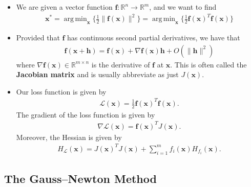\documentclass[10pt]{article}
\newcommand{\ve}[1]{\mathbf{#1}}
\newcommand{\ra}{\rightarrow}
\newcommand{\mcal}[1]{\mathcal{#1}}
\newcommand{\Real}{\mathbb{R}}
\DeclareMathOperator*{\argmin}{arg\,min}
\begin{document}
\begin{itemize}
    \item We are given a vector function $\ve{f}: \Real^n \ra \Real^m$, and we want to find
    \begin{align*}
        \ve{x}^* = \argmin_{\ve{x}} \bigg\{ \frac{1}{2} \| \ve{f}(\ve{x}) \|^2 \bigg\} = \argmin_{\ve{x}} \bigg\{ \frac{1}{2} \ve{f}(\ve{x})^T \ve{f}(\ve{x}) \bigg\} 
    \end{align*}

    \item Provided that $\ve{f}$ has continuous second partial derivatives, we have that
    \begin{align*}
        \ve{f}(\ve{x} + \ve{h}) = \ve{f}(\ve{x}) + \nabla \ve{f}(\ve{x}) \ve{h} + O(\| \ve{h}\|^2)
    \end{align*}
    where $\nabla \ve{f}(\ve{x}) \in \Real^{m \times n}$ is the derivative of $\ve{f}$ at $\ve{x}$. This is often called the {\bf Jacobian matrix} and is usually abbreviate as just $J(\ve{x})$.

    \item Our loss function is given by
    \begin{align*}
        \mcal{L}(\ve{x}) = \frac{1}{2} \ve{f}(\ve{x})^T \ve{f}(\ve{x}).
    \end{align*}
    The gradient of the loss function is given by
    \begin{align*}
        \nabla \mcal{L}(\ve{x}) = \ve{f}(\ve{x})^T J(\ve{x}).
    \end{align*}
    Moreover, the Hessian is given by
    \begin{align*}
        H_{\mcal{L}}(\ve{x}) = J(\ve{x})^T J(\ve{x}) + \sum_{i=1}^m f_i(\ve{x}) H_{f_i}(\ve{x}).
    \end{align*}
\end{itemize}

\subsection{The Gauss--Newton Method}
\end{document}
